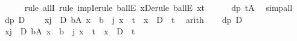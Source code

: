 \begin{isabellebody}
\ \ \ \ \isamarkupfalse%
\ {\isacharparenleft}{\kern0pt}rule\ allI{\isacharcomma}{\kern0pt}\ rule\ impI{\isacharcomma}{\kern0pt}erule\ ballE{\isacharbrackleft}{\kern0pt}\ x{\isacharequal}{\kern0pt}{\isachardoublequoteopen}D{\isachardoublequoteclose}{\isacharbrackright}{\kern0pt}{\isacharcomma}{\kern0pt}erule\ ballE{\isacharbrackleft}{\kern0pt}\ x{\isacharequal}{\kern0pt}{\isachardoublequoteopen}t{\isachardoublequoteclose}{\isacharbrackright}{\kern0pt}{\isacharparenright}{\kern0pt}\isanewline
\ \ \ \ \isamarkupfalse%
\ dp\ tA\ \isamarkupfalse%
\ simp{\isacharunderscore}{\kern0pt}all\isanewline
{}\isamarkupfalse%
\isanewline
\ \ \isamarkupfalse%
\ dp{\isacharcolon}{\kern0pt}\ {\isachardoublequoteopen}D\ {\isachargreater}{\kern0pt}\ {}{\isachardoublequoteclose}\ \isamarkupfalse%
\ {\isachardoublequoteopen}{\isacharparenleft}{\kern0pt}{\isasymforall}x{\isachardot}{\kern0pt}{\isacharparenleft}{\kern0pt}{\isasymforall}j{\isasymin}{\isacharbraceleft}{\kern0pt}{}\ {\isachardot}{\kern0pt}{\isachardot}{\kern0pt}\ D{\isacharbraceright}{\kern0pt}{\isachardot}{\kern0pt}\ {\isasymforall}b{\isasymin}A{\isachardot}{\kern0pt}\ x\ {\isasymnoteq}\ b\ {\isacharminus}{\kern0pt}\ j{\isacharparenright}{\kern0pt}{\isasymlongrightarrow}\ {\isacharparenleft}{\kern0pt}x\ {\isachargreater}{\kern0pt}\ t{\isacharparenright}{\kern0pt}\ {\isasymlongrightarrow}\ {\isacharparenleft}{\kern0pt}x\ {\isacharplus}{\kern0pt}\ D\ {\isachargreater}{\kern0pt}\ t{\isacharparenright}{\kern0pt}{\isacharparenright}{\kern0pt}{\isachardoublequoteclose}\ \isamarkupfalse%
\ arith\isanewline
{}\isamarkupfalse%
\isanewline
\ \ \isamarkupfalse%
\ dp{\isacharcolon}{\kern0pt}\ {\isachardoublequoteopen}D\ {\isachargreater}{\kern0pt}\ {}{\isachardoublequoteclose}\ \isamarkupfalse%
\ {\isachardoublequoteopen}{\isasymforall}x{\isachardot}{\kern0pt}{\isacharparenleft}{\kern0pt}{\isasymforall}j{\isasymin}{\isacharbraceleft}{\kern0pt}{}\ {\isachardot}{\kern0pt}{\isachardot}{\kern0pt}\ D{\isacharbraceright}{\kern0pt}{\isachardot}{\kern0pt}\ {\isasymforall}b{\isasymin}A{\isachardot}{\kern0pt}\ x\ {\isasymnoteq}\ b\ {\isacharminus}{\kern0pt}\ j{\isacharparenright}{\kern0pt}{\isasymlongrightarrow}\ {\isacharparenleft}{\kern0pt}x\ {\isasymge}\ t{\isacharparenright}{\kern0pt}\ {\isasymlongrightarrow}\ {\isacharparenleft}{\kern0pt}x\ {\isacharplus}{\kern0pt}\ D\ {\isasymge}\ t{\isacharparenright}{\kern0pt}{\isachardoublequoteclose}\ \isamarkupfalse%

\end{isabellebody}
